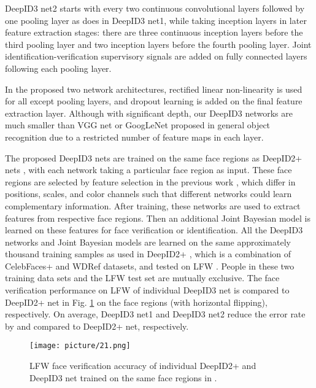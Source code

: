 \documentclass[10pt,twocolumn,letterpaper]{article}
\begin{document}
DeepID3 net2 starts with every two continuous convolutional layers followed by one pooling layer as does in DeepID3 net1, while taking inception layers \cite{szegedy2014} in later feature extraction stages: there are three continuous inception layers before the third pooling layer and two inception layers before the fourth pooling layer. Joint identification-verification supervisory signals are added on fully connected layers following each pooling layer.

In the proposed two network architectures, rectified linear non-linearity \cite{nair2010} is used for all except pooling layers, and dropout learning \cite{hinton2012} is added on the final feature extraction layer. Although with significant depth, our DeepID3 networks are much smaller than VGG net or GoogLeNet proposed in general object recognition due to a restricted number of feature maps in each layer.

The proposed DeepID3 nets are trained on the same  face regions as DeepID2+ nets \cite{sun2014c}, with each network taking a particular face region as input. These face regions are selected by feature selection in the previous work \cite{sun2014b}, which differ in positions, scales, and color channels such that different networks could learn complementary information. After training, these networks are used to extract features from respective face regions. Then an additional Joint Bayesian model \cite{chen2012} is learned on these features for face verification or identification. All the DeepID3 networks and Joint Bayesian models are learned on the same approximately  thousand training samples as used in DeepID2+ \cite{sun2014c}, which is a combination of CelebFaces+ \cite{sun2014a} and WDRef \cite{chen2012} datasets, and tested on LFW \cite{huang2007a}. People in these two training data sets and the LFW test set are mutually exclusive. The face verification performance on LFW of individual DeepID3 net is compared to DeepID2+ net in Fig. \ref{fig:net25} on the  face regions (with horizontal flipping), respectively. On average, DeepID3 net1 and DeepID3 net2 reduce the error rate by  and  compared to DeepID2+ net, respectively.

\begin{figure}[t]
\begin{center}
\texttt{[image: picture/21.png]}
\end{center}
\vspace{-0.15in}
\caption{LFW face verification accuracy of individual DeepID2+ and DeepID3 net trained on the same face regions in \cite{sun2014c}.}
\label{fig:net25}
\end{figure}
\end{document}
